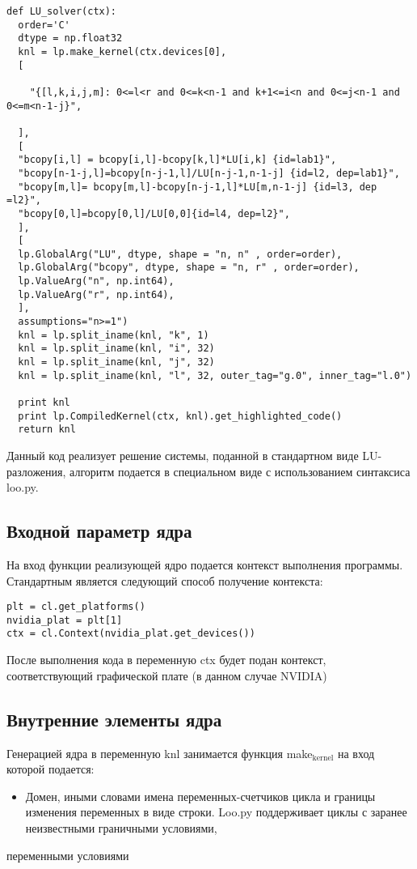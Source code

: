 \documentclass{scrartcl}
\begin{document}
\begin{verbatim}
def LU_solver(ctx):
  order='C'
  dtype = np.float32
  knl = lp.make_kernel(ctx.devices[0], 
  [

    "{[l,k,i,j,m]: 0<=l<r and 0<=k<n-1 and k+1<=i<n and 0<=j<n-1 and 0<=m<n-1-j}",

  ],
  [
  "bcopy[i,l] = bcopy[i,l]-bcopy[k,l]*LU[i,k] {id=lab1}",
  "bcopy[n-1-j,l]=bcopy[n-j-1,l]/LU[n-j-1,n-1-j] {id=l2, dep=lab1}",
  "bcopy[m,l]= bcopy[m,l]-bcopy[n-j-1,l]*LU[m,n-1-j] {id=l3, dep =l2}",
  "bcopy[0,l]=bcopy[0,l]/LU[0,0]{id=l4, dep=l2}",
  ],
  [
  lp.GlobalArg("LU", dtype, shape = "n, n" , order=order),
  lp.GlobalArg("bcopy", dtype, shape = "n, r" , order=order),
  lp.ValueArg("n", np.int64),
  lp.ValueArg("r", np.int64),
  ],
  assumptions="n>=1")
  knl = lp.split_iname(knl, "k", 1)
  knl = lp.split_iname(knl, "i", 32)
  knl = lp.split_iname(knl, "j", 32)
  knl = lp.split_iname(knl, "l", 32, outer_tag="g.0", inner_tag="l.0")

  print knl
  print lp.CompiledKernel(ctx, knl).get_highlighted_code()   
  return knl
\end{verbatim}
Данный код реализует решение системы, поданной в стандартном виде LU-разложения,
алгоритм подается в специальном виде с использованием синтаксиса loo.py.
\subsection{Входной параметр ядра}
\label{sec-7-3}

На вход функции реализующей ядро подается контекст выполнения программы. Стандартным
является следующий способ получение контекста:

\begin{verbatim}
plt = cl.get_platforms()
nvidia_plat = plt[1]
ctx = cl.Context(nvidia_plat.get_devices())
\end{verbatim}
После выполнения кода в переменную ctx будет подан контекст, соответствующий 
графической плате (в данном случае NVIDIA)
\subsection{Внутренние элементы ядра}
\label{sec-7-4}

Генерацией ядра в переменную knl занимается функция make$_{\mathrm{kernel}}$ на вход которой подается:
\begin{itemize}
\item Домен, иными словами имена переменных-счетчиков цикла и границы изменения переменных в виде строки.
 Loo.py поддерживает циклы с заранее неизвестными граничными условиями,
\end{itemize}
переменными условиями
\end{document}
